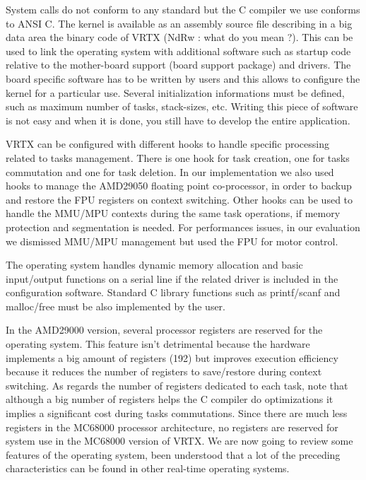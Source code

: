 \documentclass[10pt]{report}
\begin{document}
System calls do not conform to any standard but the C compiler we 
use conforms to ANSI C. The kernel is available as an assembly 
source file describing in a big data area the binary code of VRTX 
(NdRw : what do you mean ?). This can be used to link the 
operating system with additional software such as startup code 
relative to the mother-board support (board support package) and 
drivers. The board specific software has to be written by users 
and this allows to configure the kernel for a particular use. 
Several initialization informations must be defined, such as 
maximum number of tasks, stack-sizes, etc. Writing this piece of 
software is not easy and when it is done, you still have to 
develop the entire application.

VRTX can be configured with different hooks to handle specific 
processing related to tasks management. There is one hook for 
task creation, one for tasks commutation and one for task 
deletion. In our implementation we also used hooks to manage the 
AMD29050 floating point co-processor, in order to backup and 
restore the FPU registers on context switching. Other hooks can 
be used to handle the MMU/MPU contexts during the same task 
operations, if memory protection and segmentation is needed. For 
performances issues, in our evaluation we dismissed MMU/MPU 
management but used the FPU for motor control.

The operating system handles dynamic memory allocation and basic 
input/output functions on a serial line if the related driver is 
included in the configuration software. Standard C library 
functions such as printf/scanf and malloc/free must be also 
implemented by the user.

In the AMD29000 version, several processor registers are reserved 
for the operating system. This feature isn't detrimental because 
the hardware implements a big amount of registers (192) but 
improves execution efficiency because it reduces the number of 
registers to save/restore during context switching. As regards 
the number of registers dedicated to each task, note that 
although a big number of registers helps the C compiler do 
optimizations it implies a significant cost during tasks 
commutations. Since there are much less registers in the MC68000 
processor architecture, no registers are reserved for system use 
in the MC68000 version of VRTX. We are now going to review some 
features of the operating system, been understood that a lot of 
the preceding characteristics can be found in other real-time 
operating systems.
\end{document}

